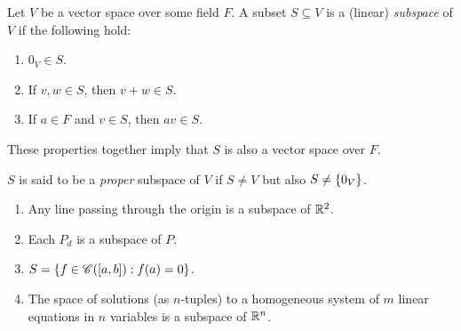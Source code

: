 \begin{defn}[Subspace] \label{defn:vector:subspace}
    Let $V$ be a vector space over some field $F$.
    A subset $S \subseteq V$ is a (linear) \emph{subspace} of $V$ if the following hold:
    \begin{enumerate}[label=(\alph*)]
        \item $0_{V} \in S$.
        \item If $v, w \in S$, then $v + w \in S$.
        \item If $a \in F$ and $v \in S$, then $a v \in S$.
    \end{enumerate}
    These properties together imply that $S$ is also a vector space over $F$.

    $S$ is said to be a \emph{proper} subspace of $V$ if $S \neq V$ but also $S \neq \set{0_{V}}$.
\end{defn}

\begin{example}
    \begin{enumerate}[label=(\alph*)]
        \item Any line passing through the origin is a subspace of $\mathbb{R}^{2}$.
        \item Each $P_{d}$ is a subspace of $P$.
        \item $S = \set{f \in \mathscr{C}([a, b]) : f(a) = 0}$.
        \item The space of solutions (as $n$-tuples) to a homogeneous system of $m$ linear equations in $n$ variables is a subspace of $\mathbb{R}^{n}$.
    \end{enumerate}
\end{example}

